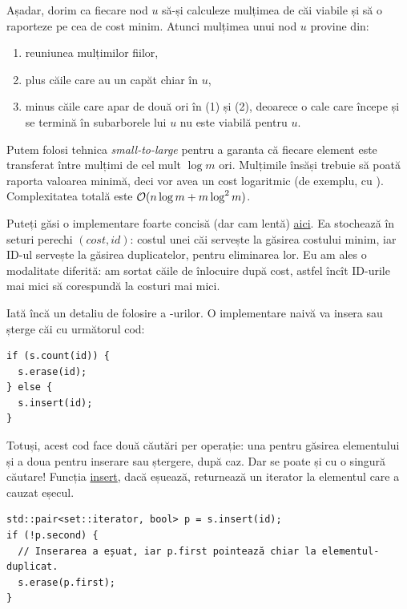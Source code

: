 \documentclass[../main.tex]{subfiles}
\begin{document}
Așadar, dorim ca fiecare nod $u$ să-și calculeze mulțimea de căi viabile și să o raporteze pe cea de cost minim. Atunci mulțimea unui nod $u$ provine din:

\begin{enumerate}
  \item reuniunea mulțimilor fiilor,

  \item plus căile care au un capăt chiar în $u$,

  \item minus căile care apar de două ori în (1) și (2), deoarece o cale care începe și se termină în subarborele lui $u$ nu este viabilă pentru $u$.
\end{enumerate}

Putem folosi tehnica \textit{small-to-large} pentru a garanta că fiecare element este transferat între mulțimi de cel mult $\log m$ ori. Mulțimile însăși trebuie să poată raporta valoarea minimă, deci vor avea un cost logaritmic (de exemplu, cu ). Complexitatea totală este $\mathcal{O}(n \log m + m \log^2 m)$.

Puteți găsi o implementare foarte concisă (dar cam lentă) \href{https://starcoder.org/video/usacovideo-usaco-2018-platinum-open-p3/}{aici}. Ea stochează în seturi perechi $(cost, id)$: costul unei căi servește la găsirea costului minim, iar ID-ul servește la găsirea duplicatelor, pentru eliminarea lor. Eu am ales o modalitate diferită: am sortat căile de înlocuire după cost, astfel încît ID-urile mai mici să corespundă la costuri mai mici.

Iată încă un detaliu de folosire a -urilor. O implementare naivă va insera sau șterge căi cu următorul cod:

\begin{verbatim}
if (s.count(id)) {
  s.erase(id);
} else {
  s.insert(id);
}
\end{verbatim}

Totuși, acest cod face două căutări per operație: una pentru găsirea elementului și a doua pentru inserare sau ștergere, după caz. Dar se poate și cu o singură căutare! Funcția \href{https://en.cppreference.com/w/cpp/container/set/insert}{insert}, dacă eșuează, returnează un iterator la elementul care a cauzat eșecul.

\begin{verbatim}
std::pair<set::iterator, bool> p = s.insert(id);
if (!p.second) {
  // Inserarea a eșuat, iar p.first pointează chiar la elementul-duplicat.
  s.erase(p.first);
}
\end{verbatim}
\end{document}

